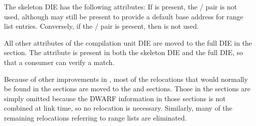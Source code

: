 The skeleton \DWTAGcompileunit{} DIE has the following attributes:
\dag{} If \DWATranges{} is present, the \DWATlowpc{}/\DWAThighpc{}
pair is not used, although \DWATlowpc{} may still be present
to provide a default base address for range list entries.
Conversely, if the \DWATlowpc/\linebreak[0]\DWAThighpc{} pair is
present, then \DWATranges{} is not used.

All other attributes of the compilation unit DIE are moved to
the full DIE in the \dotdebuginfodwo{} section.
The \DWATdwoid{} attribute is present
in both the skeleton DIE and the full DIE, so that a consumer
can verify a match.

Because of other improvements in \DWARFVersionV, most of the
relocations that would normally be found in the \dotdebuginfodwo{}
sections are moved to the \dotdebugaddr{} and
\dotdebugstroffsetsdwo{} sections. Those in the
\dotdebugstroffsetsdwo{} sections are simply omitted because the
DWARF information in those sections is not combined at link
time, so no relocation is necessary. Similarly,
many of the remaining relocations referring to range lists are
eliminated. 

